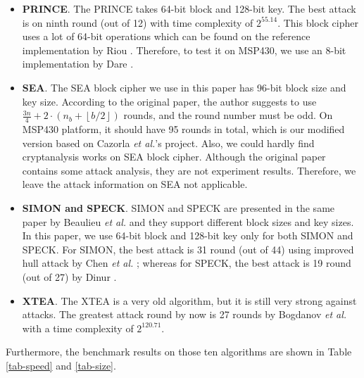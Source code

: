 \documentclass[sigconf, review=false]{acmart}
\begin{document}
\begin{itemize}
    \item
\textbf{PRINCE}. The PRINCE \cite{borghoff2012prince} takes 64-bit block and 128-bit key.
The best attack is on ninth round (out of 12) with time complexity of $2^{55.14}$.
This block cipher uses a lot of 64-bit operations which can be found on the reference implementation by Riou \cite{sebastienriou2016}.
Therefore, to test it on MSP430, we use an 8-bit implementation by Dare \cite{chrisdare2016}.

    \item
\textbf{SEA}. The SEA \cite{standaert2006sea} block cipher we use in this paper has 96-bit block size and key size.
According to the original paper, the author suggests to use $\frac{3n}{4}+2\cdot (n_{b}+\left \lfloor b/2 \right \rfloor)$ rounds, and the round number must be odd.
On MSP430 platform, it should have 95 rounds in total, which is our modified version based on Cazorla \textit{et al.}'s project.
Also, we could hardly find cryptanalysis works on SEA block cipher.
Although the original paper contains some attack analysis, they are not experiment results. Therefore, we leave the attack information on SEA not applicable.

    \item
\textbf{SIMON and SPECK}. SIMON and SPECK are presented in the same paper by Beaulieu \textit{et al.} \cite{beaulieu2015simon}
and they support different block sizes and key sizes. In this paper, we use 64-bit block and 128-bit key only for both SIMON and SPECK.
For SIMON, the best attack is 31 round (out of 44) using improved hull attack by Chen \textit{et al.} \cite{chen2016improved};
whereas for SPECK, the best attack is 19 round (out of 27) by Dinur \cite{dinur2014improved}.

    \item
\textbf{XTEA}. The XTEA \cite{wheeler1998correction} is a very old algorithm, but it is still very strong against attacks.
The greatest attack round by now is 27 rounds by Bogdanov \textit{et al.} \cite{bogdanov2012zero} with a time complexity of $2^{120.71}$.
\end{itemize}

Furthermore, the benchmark results on those ten algorithms are shown in Table \ref{tab-speed} and \ref{tab-size}.
\end{document}
